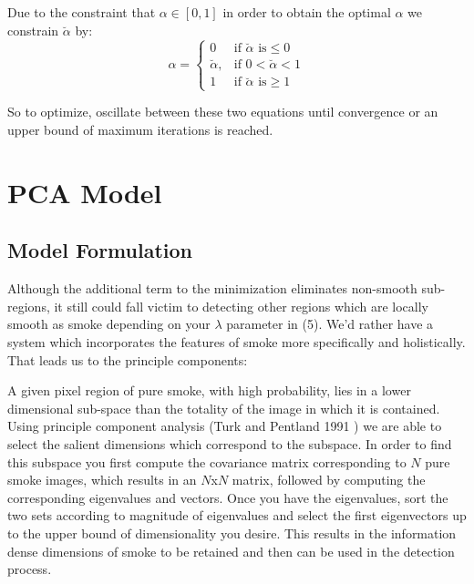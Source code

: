 \documentclass[12pt]{article}
\begin{document}
Due to the constraint that $\alpha \in \left[ 0,1\right]$ in order to obtain the optimal $\alpha$ we constrain $\breve{\alpha }$ by: 
\begin{equation}
\hat{\alpha} =  \begin{cases} 0 & \mbox{if } \breve{\alpha }\mbox{ is} \leq 0 \\ \breve{\alpha }, & \mbox{if }  0<\breve{\alpha }<1\\ 1 & \mbox{if } \breve{\alpha } \mbox{ is} \geq 1 \end{cases}
\end{equation}

So to optimize, oscillate between these two equations until convergence or an upper bound of maximum iterations is reached.   





\section{PCA Model}
\subsection{Model Formulation}

Although the additional term to the minimization eliminates non-smooth sub-regions, it still could fall victim to detecting other regions which are locally smooth as smoke depending on your $\lambda$ parameter in (5). We'd rather have a system which incorporates the features of smoke more specifically and holistically. That leads us to the principle components: 

A given pixel region of pure smoke, with high probability, lies in a lower dimensional sub-space than the totality of the image in which it is contained. Using principle component analysis (Turk and Pentland 1991 \cite{PCA}) we are able to select the salient dimensions which correspond to the subspace. In order to find this subspace you first compute the covariance matrix corresponding to $N$ pure smoke images, which results in an $N$x$N$ matrix, followed by computing the corresponding eigenvalues and vectors. Once you have the eigenvalues, sort the two sets according to magnitude of eigenvalues and select the first eigenvectors up to the upper bound of dimensionality you desire. This results in the information dense dimensions of smoke to be retained and then can be used in the detection process. 
\end{document}
